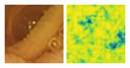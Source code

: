 \documentclass[conference]{IEEEtran}
\begin{document}
\begin{figure}[!t]
    \endminipage\hfill
        \centering
        \includegraphics[width=\linewidth]{Figures/520/520_RCAN.jpg}
       
        \vfill
        \includegraphics[width=\linewidth]{Figures/520/520_RCAN_ssim.jpg}
        

\end{figure}
\end{document}
